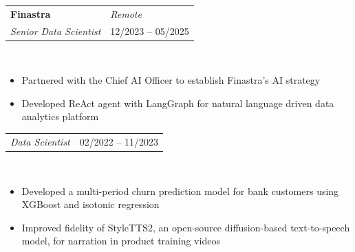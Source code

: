 \documentclass{article}
\begin{document}
\begin{tabular}{p{4.8in}p{2in}}
    \bf{Finastra}  &  \emph{Remote} \\
    \emph{Senior Data Scientist} & 12/2023 -- 05/2025
\end{tabular}
\vspace{-0.2in}
\begin{minipage}{0.03\textwidth}
~\\
\end{minipage}
\begin{minipage}{0.7\textwidth}
\begin{itemize}[label=\raisebox{0.25ex}{\tiny$\bullet$}]
    \item Partnered with the Chief AI Officer to establish Finastra’s AI strategy
    \item Developed ReAct agent with LangGraph for natural language driven data analytics platform
\end{itemize}
\end{minipage}

\vspace{0.65cm}

\begin{tabular}{p{4.8in}p{2in}}
    \emph{Data Scientist} & 02/2022 -- 11/2023
\end{tabular}
\vspace{-0.2in}
\begin{minipage}{0.03\textwidth}
~\\
\end{minipage}
\begin{minipage}{0.7\textwidth}
\begin{itemize}[label=\raisebox{0.25ex}{\tiny$\bullet$}]
    \item Developed a multi-period churn prediction model for bank customers using XGBoost and isotonic regression
    \item Improved fidelity of StyleTTS2, an open-source diffusion-based text-to-speech model, for narration in product training videos
\end{itemize}
\end{minipage}

\vspace{1cm}
\end{document}
